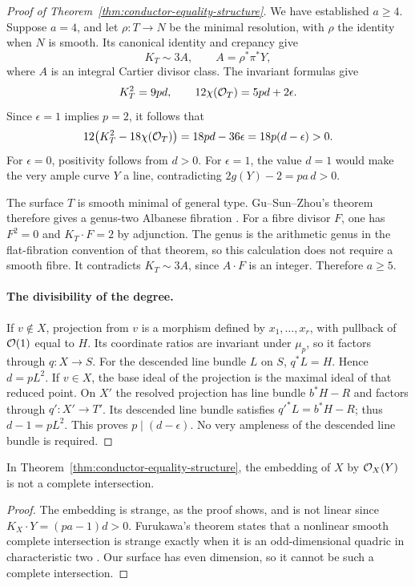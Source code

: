 \begin{proof}[Proof of Theorem~\ref{thm:conductor-equality-structure}]
We have established $a\geq4$. Suppose $a=4$, and let
$\rho:T\to N$ be the minimal resolution, with $\rho$ the identity
when $N$ is smooth. Its canonical identity and crepancy give
\[
 K_T\sim3A,\qquad A=\rho^*\pi^*Y,
\]
where $A$ is an integral Cartier divisor class. The invariant
formulas give
\[
 K_T^2=9pd,\qquad 12\chi(\mathcal O_T)=5pd+2\epsilon.
\]
Since $\epsilon=1$ implies $p=2$, it follows that
\[
 12\bigl(K_T^2-18\chi(\mathcal O_T)\bigr)
 =18pd-36\epsilon=18p(d-\epsilon)>0.
\]
For $\epsilon=0$, positivity follows from $d>0$.
For $\epsilon=1$, the value $d=1$ would make the very ample
curve $Y$ a line, contradicting $2g(Y)-2=pa\,d>0$.

The surface $T$ is smooth minimal of general type.
Gu--Sun--Zhou's theorem therefore gives a genus-two Albanese
fibration
\cite[Theorem~1.5, p.~614; Corollary~3.4 and its proof,
pp.~623--624]{GuSunZhou}.
For a fibre divisor $F$, one has $F^2=0$ and
$K_T\cdot F=2$ by adjunction.
The genus is the arithmetic genus in the flat-fibration
convention of that theorem, so this calculation does not require
a smooth fibre. It contradicts $K_T\sim3A$, since
$A\cdot F$ is an integer.
Therefore $a\geq5$.

\paragraph{The divisibility of the degree.}
If $v\notin X$, projection from $v$ is a morphism defined by
$x_1,\ldots,x_r$, with pullback of $\mathcal O(1)$ equal to $H$.
Its coordinate ratios are invariant under $\mu_p$, so it factors
through $q:X\to S$. For the descended line bundle $L$ on $S$,
$q^*L=H$. Hence $d=pL^2$.
If $v\in X$, the base ideal of the projection is the maximal
ideal of that reduced point. On $X'$ the resolved projection
has line bundle $b^*H-R$ and factors through $q':X'\to T'$.
Its descended line bundle satisfies $q'^*L=b^*H-R$; thus
$d-1=pL^2$. This proves $p\mid(d-\epsilon)$.
No very ampleness of the descended line bundle is required.
\end{proof}

\begin{corollary}\label{cor:conductor-not-complete-intersection}
In Theorem~\ref{thm:conductor-equality-structure}, the embedding
of $X$ by $\mathcal O_X(Y)$ is not a complete intersection.
\end{corollary}

\begin{proof}
The embedding is strange, as the proof shows, and is not linear
since $K_X\cdot Y=(pa-1)d>0$.
Furukawa's theorem states that a nonlinear smooth complete
intersection is strange exactly when it is an odd-dimensional
quadric in characteristic two
\cite[Theorem~1.1, author p.~2, proved in \S3]{FurukawaStrange}.
Our surface has even dimension, so it cannot be such a complete
intersection.
\end{proof}
